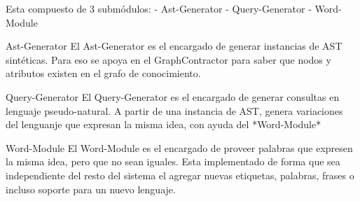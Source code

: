 Esta compuesto de 3 subm\'odulos:
- Ast-Generator
- Query-Generator
- Word-Module

Ast-Generator
El Ast-Generator es el encargado de generar instancias de AST sint\'eticas. Para eso se apoya en el GraphContractor para saber que nodos y atributos existen en el grafo de conocimiento.

Query-Generator
El Query-Generator es el encargado de generar consultas en lenguaje pseudo-natural. 
A partir de una instancia de AST, genera variaciones del lenguanje que expresan la misma idea, con ayuda del *Word-Module*

Word-Module
El Word-Module es el encargado de proveer palabras que expresen la misma idea, pero que no sean iguales.
Esta implementado de forma que sea independiente del resto del sistema el agregar nuevas etiquetas, palabras, frases o incluso soporte para un nuevo lenguaje.



